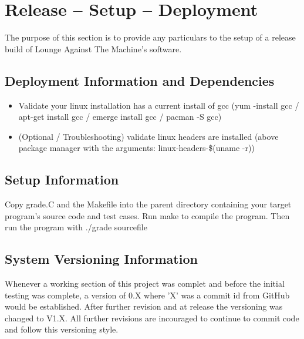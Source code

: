 
\chapter{Release -- Setup -- Deployment}

The purpose of this section is to provide any particulars to the setup of a release build of Lounge Against The Machine's software.

\section {Deployment Information and Dependencies}
\begin {itemize}
\item Validate your linux installation has a current install of gcc (yum -install gcc / apt-get install gcc / emerge install gcc  / pacman -S gcc)
\item (Optional / Troubleshooting) validate linux headers are installed (above package manager with the arguments: linux-headers-\$(uname -r))
\end {itemize}

\section{Setup Information}
Copy grade.C and the Makefile into the parent directory containing your target program's source code and test cases. Run make to compile the program. Then run the program with ./grade sourcefile

\section {System Versioning Information}
Whenever a working section of this project was complet and before the initial testing was complete, a version of 0.X where 'X' was a commit id from GitHub would be established.  After further revision and at release the versioning was changed to V1.X.  All further revisions are incouraged to continue to commit code and follow this versioning style.